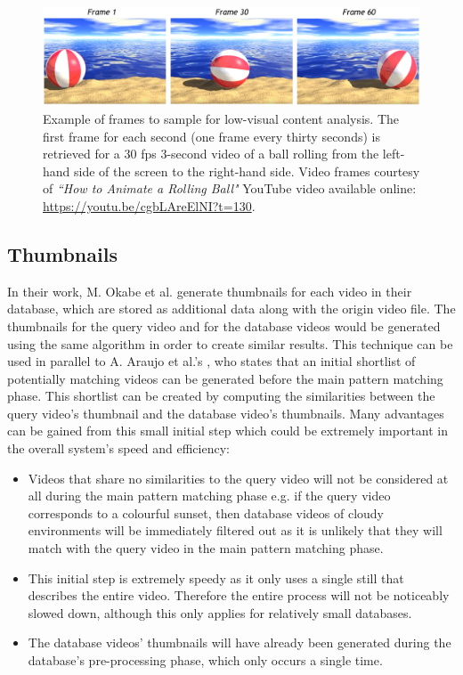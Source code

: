 \documentclass[11pt,openany,a4paper]{article}
\begin{document}
\begin{figure}[h]
\centerline{\includegraphics[width=\textwidth]{figures/ball_rolling.jpg}}
\caption{\label{fig:rolling_ball}Example of frames to sample for low-visual content analysis. The first frame for each second (one frame every thirty seconds) is retrieved for a 30 fps 3-second video of a ball rolling from the left-hand side of the screen to the right-hand side. Video frames courtesy of \textit{``How to Animate a Rolling Ball"} YouTube video available online: \url{https://youtu.be/cgbLAreElNI?t=130}.}
\end{figure}


\subsection{Thumbnails}
\label{sec:thumbnails}

In their work, M. Okabe et al. \cite{okabe2018animating} generate thumbnails for each video in their database, which are stored as additional data along with the origin video file. The thumbnails for the query video and for the database videos would be generated using the same algorithm in order to create similar results. This technique can be used in parallel to A. Araujo et al.'s \cite{araujo2017i2v}, who states that an initial shortlist of potentially matching videos can be generated before the main pattern matching phase. This shortlist can be created by computing the similarities between the query video's thumbnail and the database video's thumbnails. Many advantages can be gained from this small initial step which could be extremely important in the overall system's speed and efficiency:
\begin{itemize}
    \item Videos that share no similarities to the query video will not be considered at all during the main pattern matching phase e.g. if the query video corresponds to a colourful sunset, then database videos of cloudy environments will be immediately filtered out as it is unlikely that they will match with the query video in the main pattern matching phase.
    \item This initial step is extremely speedy as it only uses a single still that describes the entire video. Therefore the entire process will not be noticeably slowed down, although this only applies for relatively small databases.
    \item The database videos' thumbnails will have already been generated during the database's pre-processing phase, which only occurs a single time.
\end{itemize}
\end{document}
